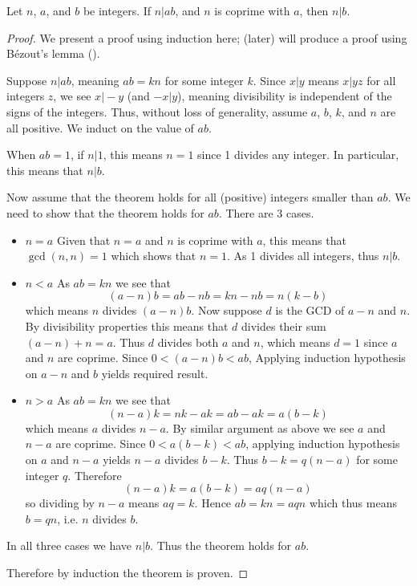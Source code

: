 \begin{theorem}\label{theorem-n-divides-ab-and-n-coprime-with-a-implies-n-divides-b}
    Let $n$, $a$, and $b$ be integers. If $n \vert ab$, and $n$ is coprime with $a$, then $n \vert b$.
\end{theorem}
\begin{proof}
    We present a proof using induction here;  (later) will produce a proof using B\'ezout's lemma ().

    Suppose $n \vert ab$, meaning $ab = kn$ for some integer $k$. Since $x\vert y$ means $x\vert yz$ for all integers $z$, we see $x \vert -y$ (and $-x \vert y$), meaning divisibility is independent of the signs of the integers. Thus, without loss of generality, assume $a$, $b$, $k$, and $n$ are all positive. We induct on the value of $ab$.

    When $ab = 1$, if $n \vert 1$, this means $n = 1$ since 1 divides any integer. In particular, this means that $n \vert b$.

    Now assume that the theorem holds for all (positive) integers smaller than $ab$. We need to show that the theorem holds for $ab$. There are 3 cases.
    \begin{itemize}
        \item $\boxed{n=a}$ Given that $n = a$ and $n$ is coprime with $a$, this means that $\gcd(n,n) = 1$ which shows that $n = 1$. As 1 divides all integers, thus $n \vert b$.
        
        \item $\boxed{n<a}$ As $ab = kn$ we see that
        \[
            (a-n)b = ab - nb = kn - nb = n(k-b)
        \]
        which means $n$ divides $(a-n)b$. Now suppose $d$ is the GCD of $a-n$ and $n$. By divisibility properties this means that $d$ divides their sum $(a-n)+n = a$. Thus $d$ divides both $a$ and $n$, which means $d = 1$ since $a$ and $n$ are coprime. Since $0 < (a-n)b < ab$, Applying induction hypothesis on $a-n$ and $b$ yields required result.
        
        \item $\boxed{n>a}$ As $ab = kn$ we see that
        \[
            (n-a)k = nk - ak = ab - ak = a(b-k)
        \]
        which means $a$ divides $n-a$. By similar argument as above we see $a$ and $n-a$ are coprime. Since $0 < a(b-k)<ab$, applying induction hypothesis on $a$ and $n-a$ yields $n-a$ divides $b-k$. Thus $b-k = q(n-a)$ for some integer $q$. Therefore
        \[
            (n-a)k = a(b-k) = aq(n-a)
        \]
        so dividing by $n-a$ means $aq = k$. Hence $ab = kn = aqn$ which thus means $b = qn$, i.e. $n$ divides $b$.
    \end{itemize}
    In all three cases we have $n \vert b$. Thus the theorem holds for $ab$.

    Therefore by induction the theorem is proven.
\end{proof}

